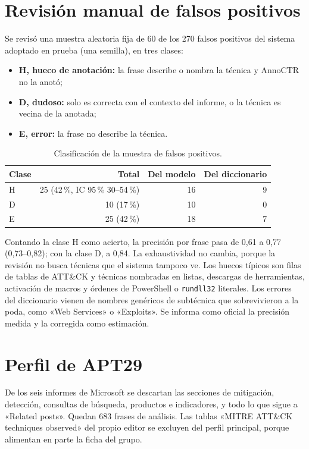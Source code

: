 \section{Revisión manual de falsos positivos}

Se revisó una muestra aleatoria fija de 60 de los 270 falsos positivos del sistema adoptado en
prueba (una semilla), en tres clases:
\begin{itemize}
    \item \textbf{H, hueco de anotación:} la frase describe o nombra la técnica y AnnoCTR no la anotó;
    \item \textbf{D, dudoso:} solo es correcta con el contexto del informe, o la técnica es vecina de la anotada;
    \item \textbf{E, error:} la frase no describe la técnica.
\end{itemize}

\begin{table}[H]
\centering
\begin{tabular}{|l|r|r|r|}
\hline
\textbf{Clase} & \textbf{Total} & \textbf{Del modelo} & \textbf{Del diccionario} \\
\hline
H & 25 (42\,\%, IC 95\,\% 30--54\,\%) & 16 & 9 \\
D & 10 (17\,\%) & 10 & 0 \\
E & 25 (42\,\%) & 18 & 7 \\
\hline
\end{tabular}
\caption{Clasificación de la muestra de falsos positivos.}
\end{table}

Contando la clase H como acierto, la precisión por frase pasa de 0,61 a 0,77 (0,73--0,82); con la
clase D, a 0,84. La exhaustividad no cambia, porque la revisión no busca técnicas que el sistema
tampoco ve. Los huecos típicos son filas de tablas de ATT\&CK y técnicas nombradas en listas,
descargas de herramientas, activación de macros y órdenes de PowerShell o \texttt{rundll32}
literales. Los errores del diccionario vienen de nombres genéricos de subtécnica que
sobrevivieron a la poda, como «Web Services» o «Exploits». Se informa como oficial la precisión
medida y la corregida como estimación.

\section{Perfil de APT29}

De los seis informes de Microsoft se descartan las secciones de mitigación, detección, consultas
de búsqueda, productos e indicadores, y todo lo que sigue a «Related posts». Quedan 683 frases de
análisis. Las tablas «MITRE ATT\&CK techniques observed» del propio editor se excluyen del perfil
principal, porque alimentan en parte la ficha del grupo.

